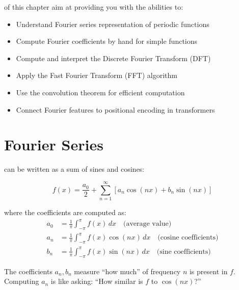 \vspace{2em}
 of this chapter aim at providing you with the abilities to:
\begin{itemize}
    \item Understand Fourier series representation of periodic functions
    \item Compute Fourier coefficients by hand for simple functions
    \item Compute and interpret the Discrete Fourier Transform (DFT)
    \item Apply the Fast Fourier Transform (FFT) algorithm
    \item Use the convolution theorem for efficient computation
    \item Connect Fourier features to positional encoding in transformers
\end{itemize}





\newpage
\section{Fourier Series}

 can be written as a sum of sines and cosines:

\begin{equation}
    \boxed{f(x) = \frac{a_0}{2} + \sum_{n=1}^{\infty} \left[a_n \cos(nx) + b_n \sin(nx)\right]}
\end{equation}

where the coefficients are computed as:
\begin{align}
    a_0 &= \frac{1}{\pi} \int_{-\pi}^{\pi} f(x) \, dx \quad \text{(average value)} \\
    a_n &= \frac{1}{\pi} \int_{-\pi}^{\pi} f(x) \cos(nx) \, dx \quad \text{(cosine coefficients)} \\
    b_n &= \frac{1}{\pi} \int_{-\pi}^{\pi} f(x) \sin(nx) \, dx \quad \text{(sine coefficients)}
\end{align}

 The coefficients $a_n, b_n$ measure ``how much'' of frequency $n$ is present in $f$.
Computing $a_n$ is like asking: ``How similar is $f$ to $\cos(nx)$?''




